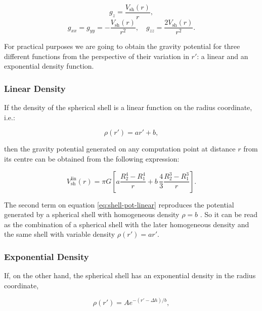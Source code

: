 \documentclass[extra]{gji}
\begin{document}
\begin{equation}
    g_z = \frac{V_\text{sh}(r)}{r},
\end{equation}
\begin{equation}
    g_{xx} = g_{yy} = -\frac{V_\text{sh}(r)}{r^2}, \quad
    g_{zz} = \frac{2V_\text{sh}(r)}{r^2}.
\end{equation}

For practical purposes we are going to obtain the gravity potential for three different functions from the perspective of their variation in $r'$: a linear and an exponential density function.


\subsubsection{Linear Density}

If the density of the spherical shell is a linear function on the radius coordinate, i.e.:

\begin{equation}
    \rho(r') = ar' + b,
\end{equation}

\noindent then the gravity potential generated on any computation point at distance $r$ from its centre can be obtained from the following expression:

\begin{equation}
    V_\text{sh}^\text{lin}(r) = \pi G \left[ 
    a \frac{R_2^4 - R_1^4}{r} +
    b \,\frac{4}{3} \frac{R_2^3 - R_1^3}{r} \right].
    \label{eq:shell-pot-linear}
\end{equation}

The second term on equation \ref{eq:shell-pot-linear} reproduces the potential generated by a spherical shell with homogeneous density $\rho = b$ \citep{Mikuska2006,Grombein2013}.
So it can be read as the combination of a spherical shell with the later homogeneous density and the same shell with variable density $\rho(r') = ar'$.


\subsubsection{Exponential Density}

If, on the other hand, the spherical shell has an exponential density in the radius coordinate,

\begin{equation}
    \rho(r') = Ae^{-(r' - \Delta h)/b},
\end{equation}
\end{document}
